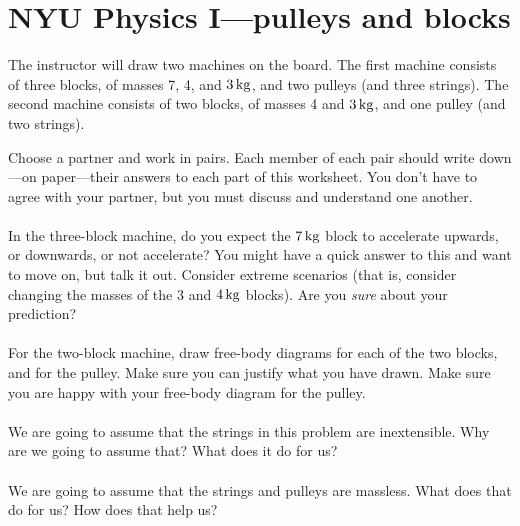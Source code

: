 \documentclass[12pt]{article}
\begin{document}
\section*{NYU Physics I---pulleys and blocks}

The instructor will draw two machines on the board. The first machine
consists of three blocks, of masses 7, 4, and $3\,\mathrm{kg}$, and two
pulleys (and three strings). The second machine consists of two
blocks, of masses 4 and $3\,\mathrm{kg}$, and one pulley (and two strings).

Choose a partner and work in pairs. Each member of each pair should
write down---on paper---their answers to each part of this worksheet.
You don't have to agree with your partner, but you must discuss and
understand one another.

\paragraph{\theproblem}%
In the three-block machine, do you expect the $7\,\mathrm{kg}$ block to
accelerate upwards, or downwards, or not accelerate? You might have a
quick answer to this and want to move on, but talk it out. Consider
extreme scenarios (that is, consider changing the masses of the 3 and
$4\,\mathrm{kg}$ blocks). Are you \emph{sure} about your prediction?

\paragraph{\theproblem}%
For the two-block machine, draw free-body diagrams for each of the two
blocks, and for the pulley. Make sure you can justify what you have
drawn. Make sure you are happy with your free-body diagram for the
pulley.

\paragraph{\theproblem}%
We are going to assume that the strings in this problem are
inextensible. Why are we going to assume that? What does it do for us?

\paragraph{\theproblem}%
We are going to assume that the strings and pulleys are massless. What
does that do for us? How does that help us?
\end{document}

